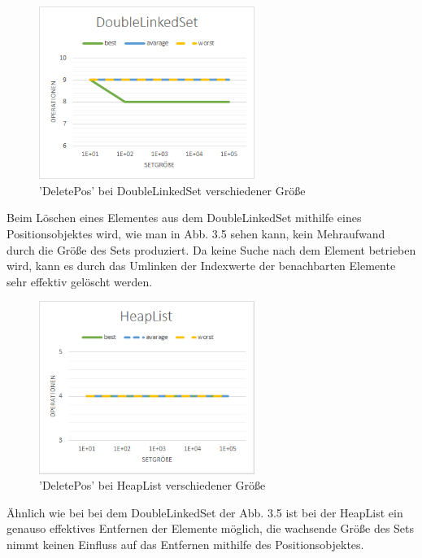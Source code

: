 \documentclass[paper=a4, fontsize=11pt]{scrartcl} %
\numberwithin{equation}{section} %
\numberwithin{figure}{section} %
\numberwithin{table}{section} %
\begin{document}
\begin{figure}[h]
	\begin{center}
		\includegraphics[width=7cm]{grafiken/DeletePos-DoubleLinkedSet.png}
		\caption{'DeletePos' bei DoubleLinkedSet verschiedener Größe}
	\end{center}
\end{figure}
Beim Löschen eines Elementes aus dem DoubleLinkedSet mithilfe eines Positionsobjektes wird, wie man in Abb. 3.5 sehen kann, kein Mehraufwand durch die Größe des Sets produziert. Da keine Suche nach dem Element betrieben wird, kann es durch das Umlinken der Indexwerte der benachbarten Elemente sehr effektiv gelöscht werden.
\newpage
\begin{figure}[h]
	\begin{center}
		\includegraphics[width=7cm]{grafiken/DeletePos-HeapList.png}
		\caption{'DeletePos' bei HeapList verschiedener Größe}
	\end{center}
\end{figure}
Ähnlich wie bei bei dem DoubleLinkedSet der Abb. 3.5 ist bei der HeapList ein genauso effektives Entfernen der Elemente möglich, die wachsende Größe des Sets nimmt keinen Einfluss auf das Entfernen mithilfe des Positionsobjektes.  
\onecolumn
\end{document}
